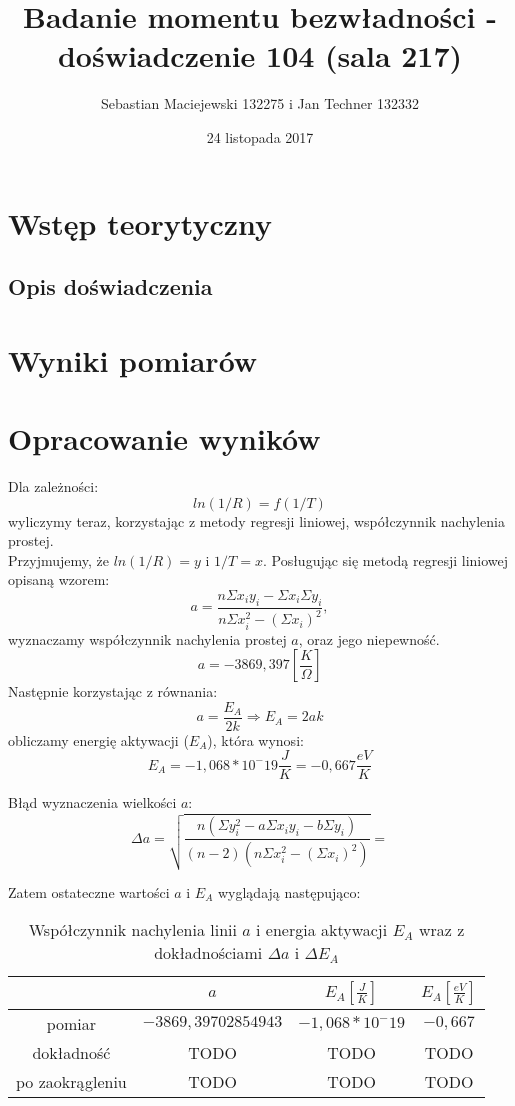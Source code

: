 \documentclass[10pt,a4paper]{article}
\author{Sebastian Maciejewski 132275 i Jan Techner 132332}
\title{Badanie momentu bezwładności - \\ doświadczenie 104 (sala 217)}
\date{24 listopada 2017}
\newcommand{\forceindent}{\leavevmode{\parindent=3em\indent}}
\begin{document}
\maketitle
\section{Wstęp teorytyczny}


\subsection*{Opis doświadczenia}

\section{Wyniki pomiarów}

\section{Opracowanie wyników}
\forceindent Dla zależności:
\begin{equation}
ln(1/R) = f(1/T)
\end{equation}  
wyliczymy teraz, korzystając z metody regresji liniowej, współczynnik nachylenia prostej.\\
Przyjmujemy, że $ln(1/R) = y$ i $1/T = x$.
Posługując się metodą regresji liniowej opisaną wzorem:
\begin{equation}
a=\frac{n\Sigma x_i y_i - \Sigma x_i \Sigma y_i}{n\Sigma x_i^2 - (\Sigma x_i)^2},
\end{equation}
wyznaczamy współczynnik nachylenia prostej $a$, oraz jego niepewność. 
\begin{equation}
a = -3869,397 \left[\frac{K}{\Omega}\right]
\end{equation}
Następnie korzystając z równania:
\begin{equation}
a = \frac{E_A}{2k} \Rightarrow E_A = 2ak
\end{equation}
obliczamy energię aktywacji ($E_A$), która wynosi:
$$ E_A = -1,068 * 10^-19 \frac{J}{K} = -0,667 \frac{eV}{K} $$

Błąd wyznaczenia wielkości $a$:\\
$$ \Delta a = \sqrt{\frac{n(\Sigma y_i ^2 - a \Sigma x_i y_i - b\Sigma y_i)}{(n-2)(n \Sigma x_i ^2 - (\Sigma x_i)^2)}} = $$


\forceindent Zatem ostateczne wartości $a$ i $E_A$ wyglądają następująco:

\begin{table}[!h]
\centering
\begin{tabular}{|cc||c|c|}
\multicolumn{1}{c}{} & \multicolumn{1}{c}{$a$} & \multicolumn{1}{c}{$E_A [\frac{J}{K}]$} & \multicolumn{1}{c}{$E_A [\frac{eV}{K}]$}\\
\hline
pomiar & $-3869,39702854943$ & $-1,068 * 10^-19$ & $-0,667$\\
\hline
dokładność & TODO & TODO & TODO\\
\hline
po zaokrągleniu & TODO  & TODO & TODO\\
\hline
\end{tabular}
\caption{Współczynnik nachylenia linii $a$ i energia aktywacji $E_A$ wraz z dokładnościami $\Delta a$ i $\Delta E_A$}
\end{table}
\end{document}
